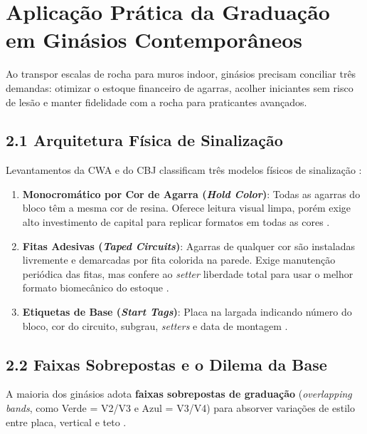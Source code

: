 \section{Aplicação Prática da Graduação em Ginásios Contemporâneos}

Ao transpor escalas de rocha para muros indoor, ginásios precisam conciliar três demandas: otimizar o estoque financeiro de agarras, acolher iniciantes sem risco de lesão e manter fidelidade com a rocha para praticantes avançados.

\subsection*{2.1 Arquitetura Física de Sinalização}

Levantamentos da CWA e do CBJ classificam três modelos físicos de sinalização \cite{cbj_tape, cwa_colors}:
\begin{enumerate}
    \item \textbf{Monocromático por Cor de Agarra (\textit{Hold Color})}: Todas as agarras do bloco têm a mesma cor de resina. Oferece leitura visual limpa, porém exige alto investimento de capital para replicar formatos em todas as cores \cite{cbj_tape}.
    \item \textbf{Fitas Adesivas (\textit{Taped Circuits})}: Agarras de qualquer cor são instaladas livremente e demarcadas por fita colorida na parede. Exige manutenção periódica das fitas, mas confere ao \textit{setter} liberdade total para usar o melhor formato biomecânico do estoque \cite{cwa_colors}.
    \item \textbf{Etiquetas de Base (\textit{Start Tags})}: Placa na largada indicando número do bloco, cor do circuito, subgrau, \textit{setters} e data de montagem \cite{bmc_grades, reddit_hangar}.
\end{enumerate}

\subsection*{2.2 Faixas Sobrepostas e o Dilema da Base}

A maioria dos ginásios adota \textbf{faixas sobrepostas de graduação} (\textit{overlapping bands}, como Verde = V2/V3 e Azul = V3/V4) para absorver variações de estilo entre placa, vertical e teto \cite{bp_grades, womens_gradient}.

